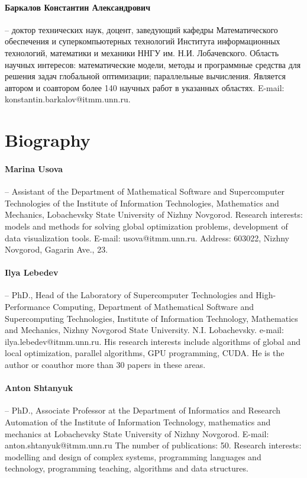 \documentclass[a4paper,12pt,russian]{article}
\begin{document}
\paragraph{Баркалов Константин Александрович} -- 
доктор технических наук, доцент, заведующий кафедры Математического обеспечения и суперкомпьютерных технологий Института информационных технологий, математики и механики ННГУ им. Н.И. Лобачевского. Область научных интересов: математические модели, методы и программные средства для решения задач глобальной оптимизации; параллельные вычисления. Является автором и соавтором более 140 научных работ в указанных областях. E-mail: konstantin.barkalov@itmm.unn.ru. 

\section*{Biography}

\paragraph{Marina Usova} -- Assistant of the Department of Mathematical Software and Supercomputer Technologies of the Institute of Information Technologies, Mathematics and Mechanics, Lobachevsky State University of Nizhny Novgorod. Research interests: models and methods for solving global optimization problems, development of data visualization tools. E-mail: usova@itmm.unn.ru. Address: 603022, Nizhny Novgorod, Gagarin Ave., 23.
\paragraph{Ilya Lebedev} -- PhD., Head of the Laboratory of Supercomputer Technologies and High-Performance Computing, Department of Mathematical Software and Supercomputing Technologies, Institute of Information Technology, Mathematics and Mechanics, Nizhny Novgorod State University. N.I. Lobachevsky. e-mail: ilya.lebedev@itmm.unn.ru. His research interests include algorithms of global and local optimization, parallel algorithms, GPU programming, CUDA. He is the author or coauthor more than 30 papers in these areas.
\paragraph{Anton Shtanyuk} -- PhD., Associate Professor at the Department of Informatics and Research Automation of the Institute of Information Technology, mathematics and mechanics at Lobachevsky State University of Nizhny Novgorod. E-mail: anton.shtanyuk@itmm.unn.ru The number of publications: 50. Research interests: modelling and design of complex systems, programming languages and technology, programming teaching, algorithms and data structures.
\end{document}
